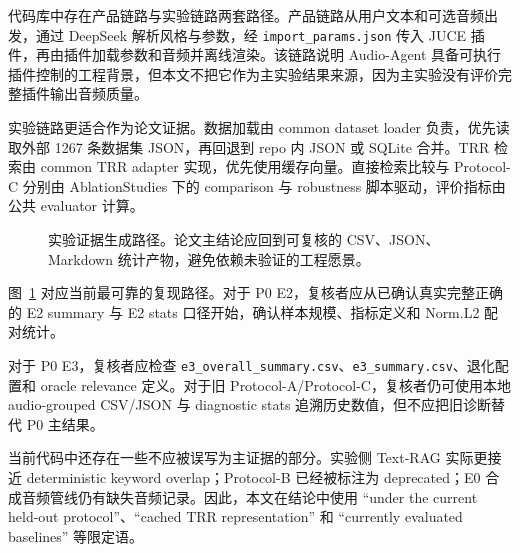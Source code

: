 代码库中存在产品链路与实验链路两套路径。产品链路从用户文本和可选音频出发，通过 DeepSeek 解析风格与参数，经 \texttt{import\_params.json} 传入 JUCE 插件，再由插件加载参数和音频并离线渲染。该链路说明 Audio-Agent 具备可执行插件控制的工程背景，但本文不把它作为主实验结果来源，因为主实验没有评价完整插件输出音频质量。

实验链路更适合作为论文证据。数据加载由 common dataset loader 负责，优先读取外部 1267 条数据集 JSON，再回退到 repo 内 JSON 或 SQLite 合并。TRR 检索由 common TRR adapter 实现，优先使用缓存向量。直接检索比较与 Protocol-C 分别由 AblationStudies 下的 comparison 与 robustness 脚本驱动，评价指标由公共 evaluator 计算。

\begin{figure}[H]
	\centering
	\caption{实验证据生成路径。论文主结论应回到可复核的 CSV、JSON、Markdown 统计产物，避免依赖未验证的工程愿景。}
	\label{fig:experiment-evidence-flow}
\end{figure}

图~\ref{fig:experiment-evidence-flow} 对应当前最可靠的复现路径。对于 P0 E2，复核者应从已确认真实完整正确的 E2 summary 与 E2 stats 口径开始，确认样本规模、指标定义和 Norm.L2 配对统计。

对于 P0 E3，复核者应检查 \texttt{e3\_overall\_summary.csv}、\texttt{e3\_summary.csv}、退化配置和 oracle relevance 定义。对于旧 Protocol-A/Protocol-C，复核者仍可使用本地 audio-grouped CSV/JSON 与 diagnostic stats 追溯历史数值，但不应把旧诊断替代 P0 主结果。

当前代码中还存在一些不应被误写为主证据的部分。实验侧 Text-RAG 实际更接近 deterministic keyword overlap；Protocol-B 已经被标注为 deprecated；E0 合成音频管线仍有缺失音频记录。因此，本文在结论中使用 “under the current held-out protocol”、“cached TRR representation” 和 “currently evaluated baselines” 等限定语。
